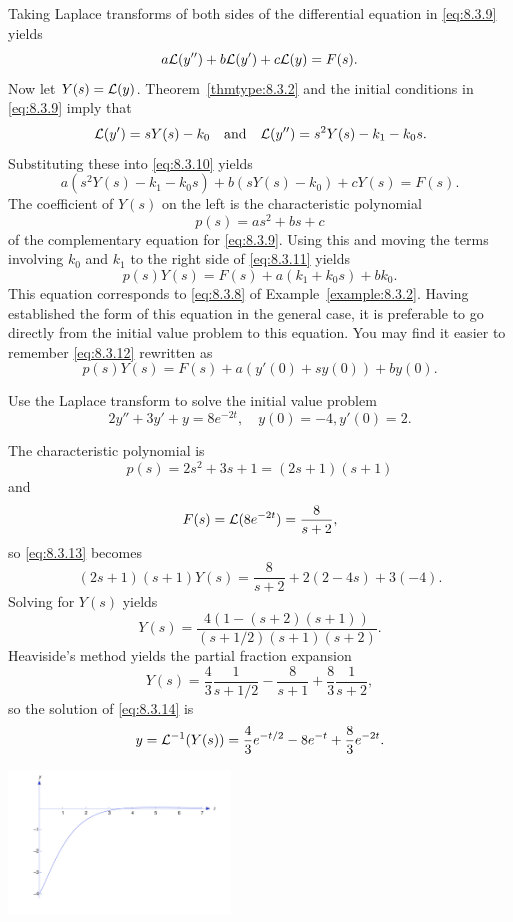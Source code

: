 \documentclass{ximera}
\begin{document}
Taking Laplace transforms of both sides of  the differential
equation in \eqref{eq:8.3.9} yields
\begin{equation}\label{eq:8.3.10}
a{\cal L}(y'')+b{\cal L}(y')+c{\cal L}(y)=F(s).
\end{equation}
Now let $Y(s)={\cal L}(y)$.  Theorem~\ref{thmtype:8.3.2} and the
initial conditions in \eqref{eq:8.3.9} imply that
$$
{\cal L}(y')=sY(s)-k_0\quad\mbox{and}\quad {\cal L}(y'')=s^2Y(s)-k_1-k_0s.
$$
Substituting these  into  \eqref{eq:8.3.10} yields
\begin{equation}\label{eq:8.3.11}
a\left(s^2Y(s)-k_1-k_0s\right)+b\left(sY(s)-k_0\right)+cY(s)=F(s).
\end{equation}
The coefficient of $Y(s)$ on the left is the characteristic
polynomial
$$
p(s)=as^2+bs+c
$$
of the complementary equation for \eqref{eq:8.3.9}. Using this and moving
the terms involving $k_0$ and $k_1$ to the right side of \eqref{eq:8.3.11}
yields
\begin{equation}\label{eq:8.3.12}
p(s)Y(s)=F(s)+a(k_1+k_0s)+bk_0.
\end{equation}
This equation corresponds to \eqref{eq:8.3.8} of Example~\ref{example:8.3.2}.
Having established the form of this equation in the general case, it
is preferable to go directly from the initial value problem to this
equation. You may find it easier to remember \eqref{eq:8.3.12} rewritten
as
\begin{equation} \label{eq:8.3.13}
p(s)Y(s)=F(s)+a\left(y'(0)+sy(0)\right)+by(0).
\end{equation}

\begin{example}\label{example:8.3.3}
 Use the Laplace transform to solve the
initial value problem
\begin{equation}\label{eq:8.3.14}
2y''+3y'+y=8e^{-2t}, \quad   y(0)=-4,  y'(0)=2.
\end{equation}

\begin{explanation}
The characteristic polynomial is
$$
p(s)=2s^2+3s+1=(2s+1)(s+1)
$$
 and
$$
F(s)={\cal L}(8e^{-2t})=\frac{8}{s+2},
$$
so \eqref{eq:8.3.13} becomes
$$
(2s+1)(s+1)Y(s)=\frac{8}{s+2}+2(2-4s)+3(-4).
$$
Solving  for $Y(s)$ yields
$$
Y(s)=\frac{4\left(1-(s+2)(s+1)\right)}{(s+1/2)(s+1)(s+2)}.
$$
Heaviside's method yields the partial fraction expansion
$$
Y(s)=\frac{4}{3}\frac{1}{s+1/2}-\frac{8}{s+1}+\frac{8}{3}\frac{1}{s+2},
$$
so the solution of  \eqref{eq:8.3.14} is
$$
y={\cal L}^{-1}(Y(s))=\frac{4}{3}e^{-t/2}-8e^{-t}+\frac{8}{3}e^{-2t}.
$$

\begin{image}
 \includegraphics[height=1.5in]{fig080301.jpg}
 \end{image}
\end{explanation}
\end{example}
\end{document}
